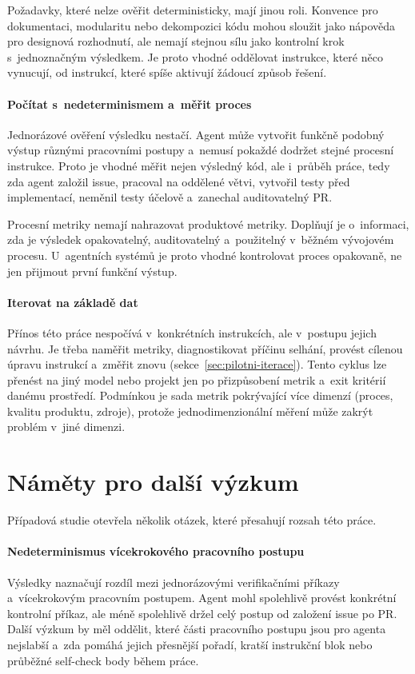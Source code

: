 Požadavky, které nelze ověřit deterministicky, mají jinou roli.
Konvence pro dokumentaci, modularitu nebo dekompozici kódu mohou
sloužit jako nápověda pro designová rozhodnutí, ale nemají stejnou
sílu jako kontrolní krok s~jednoznačným výsledkem. Je proto vhodné
oddělovat instrukce, které něco vynucují, od instrukcí, které spíše
aktivují žádoucí způsob řešení.

\paragraph{Počítat s~nedeterminismem a~měřit proces}
Jednorázové ověření výsledku nestačí. Agent může vytvořit funkčně
podobný výstup různými pracovními postupy a~nemusí pokaždé dodržet
stejné procesní instrukce. Proto je vhodné měřit nejen výsledný kód,
ale i~průběh práce, tedy zda agent založil issue, pracoval na
oddělené větvi, vytvořil testy před implementací, neměnil testy
účelově a~zanechal auditovatelný PR.

Procesní metriky nemají nahrazovat produktové metriky. Doplňují je
o~informaci, zda je výsledek opakovatelný, auditovatelný a~použitelný
v~běžném vývojovém procesu. U~agentních systémů je proto vhodné
kontrolovat proces opakovaně, ne jen přijmout první funkční výstup.

\paragraph{Iterovat na základě dat}
Přínos této práce nespočívá v~konkrétních instrukcích,
ale v~postupu jejich návrhu. Je třeba naměřit metriky, diagnostikovat
příčinu selhání, provést cílenou úpravu instrukcí a~změřit
znovu (sekce~\ref{sec:pilotni-iterace}). Tento cyklus lze přenést
na jiný model nebo projekt jen po přizpůsobení metrik a~exit
kritérií danému prostředí. Podmínkou je sada metrik pokrývající
více dimenzí (proces, kvalitu produktu, zdroje), protože
jednodimenzionální měření může zakrýt problém v~jiné dimenzi.

\section{Náměty pro další výzkum}
\label{sec:dalsi-vyzkum}

Případová studie otevřela několik otázek, které přesahují rozsah
této práce.

\paragraph{Nedeterminismus vícekrokového pracovního postupu}
Výsledky naznačují rozdíl mezi jednorázovými verifikačními příkazy
a~vícekrokovým pracovním postupem. Agent mohl spolehlivě provést
konkrétní kontrolní příkaz, ale méně spolehlivě držel celý postup od
založení issue po PR. Další výzkum by měl oddělit, které části
pracovního postupu jsou pro agenta nejslabší a~zda pomáhá jejich
přesnější pořadí, kratší instrukční blok nebo průběžné self-check
body během práce.

